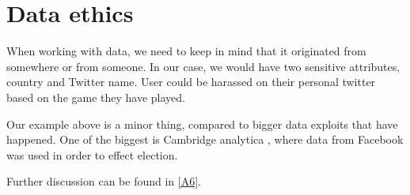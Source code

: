 \section{Data ethics}\label{Data ethics}

When working with data, we need to keep in mind that it originated from somewhere or from someone. In our case, we would have two sensitive attributes, country and Twitter name. User could be harassed on their personal twitter based on the game they have played.

Our example above is a minor thing, compared to bigger data exploits that have happened. One of the biggest is Cambridge analytica \parencite{berghel2018malice}, where data from Facebook was used in order to effect election.

Further discussion can be found in \ref{A6}.